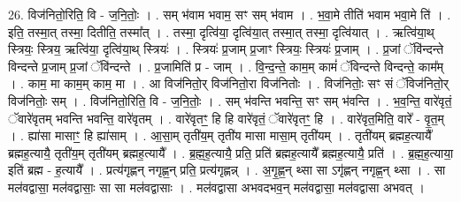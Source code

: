 \documentclass[17pt]{extarticle}
\begin{document}
26. विज॑नितो॒रिति॒ वि - ज॒नि॒तोः॒ । . सम् भ॑वाम भवाम॒ सꣳ सम् भ॑वाम । . भ॒वा॒मे तीति॑ भवाम भवा॒मे ति॑ । . इति॒ तस्मा॒त् तस्मा॒ दितीति॒ तस्मा᳚त् । . तस्मा॒ दृत्वि॑या॒ दृत्वि॑या॒त् तस्मा॒त् तस्मा॒ दृत्वि॑यात् । . ऋत्वि॑या॒थ् स्त्रियः॒ स्त्रिय॒ ऋत्वि॑या॒ दृत्वि॑या॒थ् स्त्रियः॑ । . स्त्रियः॑ प्र॒जाम् प्र॒जाꣳ स्त्रियः॒ स्त्रियः॑ प्र॒जाम् । . प्र॒जां ॅवि॑न्दन्ते विन्दन्ते प्र॒जाम् प्र॒जां ॅवि॑न्दन्ते । . प्र॒जामिति॑ प्र - जाम् । . वि॒न्द॒न्ते॒ काम॒म् कामं॑ ॅविन्दन्ते विन्दन्ते॒ काम᳚म् । . काम॒ मा काम॒म् काम॒ मा । . आ विज॑नितो॒र् विज॑नितो॒रा विज॑नितोः । . विज॑नितोः॒ सꣳ सं ॅविज॑नितो॒र् विज॑नितोः॒ सम् । . विज॑नितो॒रिति॒ वि - ज॒नि॒तोः॒ । . सम् भ॑वन्ति भवन्ति॒ सꣳ सम् भ॑वन्ति । . भ॒व॒न्ति॒ वारे॑वृतं॒ ॅवारे॑वृतम् भवन्ति भवन्ति॒ वारे॑वृतम् । . वारे॑वृतꣳ॒॒ हि हि वारे॑वृतं॒ ॅवारे॑वृतꣳ॒॒ हि । . वारे॑वृत॒मिति॒ वारे᳚ - वृ॒त॒म् । . ह्या॑सा मासाꣳ॒॒ हि ह्या॑साम् । . आ॒सा॒म् तृती॑य॒म् तृती॑य मासा मासा॒म् तृती॑यम् । . तृती॑यम् ब्रह्मह॒त्यायै᳚ ब्रह्मह॒त्यायै॒ तृती॑य॒म् तृती॑यम् ब्रह्मह॒त्यायै᳚ । . ब्र॒ह्म॒ह॒त्यायै॒ प्रति॒ प्रति॑ ब्रह्मह॒त्यायै᳚ ब्रह्मह॒त्यायै॒ प्रति॑ । . ब्र॒ह्म॒ह॒त्याया॒ इति॑ ब्रह्म - ह॒त्यायै᳚ । . प्रत्य॑गृह्णन् नगृह्ण॒न् प्रति॒ प्रत्य॑गृह्णन्न् । . अ॒गृ॒ह्ण॒न् थ्सा सा ऽगृ॑ह्णन् नगृह्ण॒न् थ्सा । . सा मल॑वद्वासा॒ मल॑वद्वासाः॒ सा सा मल॑वद्वासाः । . मल॑वद्वासा अभवदभव॒न् मल॑वद्वासा॒ मल॑वद्वासा अभवत् । \newline
\end{document}
